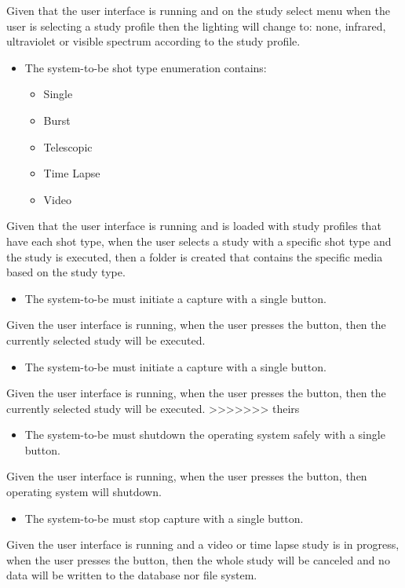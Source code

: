 Given that the user interface is running and on the study select menu when the user is selecting a study profile then the lighting will change to: none, infrared, ultraviolet or visible spectrum according to the study profile.
\begin{itemize}
	\item The system-to-be shot type enumeration contains:
	      \begin{itemize}
		      \item Single
		      \item Burst
		      \item Telescopic
		      \item Time Lapse
		      \item Video
	      \end{itemize}
\end{itemize}
Given that the user interface is running and is loaded with study profiles that have each shot type, when the user selects a study with a specific shot type and the study is executed, then a folder is created that contains the specific media based on the study type.
\begin{itemize}
	\item The system-to-be must initiate a capture with a single button.
\end{itemize}
Given the user interface is running, when the user presses the button, then the currently selected study will be executed.
\begin{itemize}
	\item The system-to-be must initiate a capture with a single button.
\end{itemize}
Given the user interface is running, when the user presses the button, then the currently selected study will be executed.
>>>>>>> theirs
\begin{itemize}
	\item The system-to-be must shutdown the operating system safely with a single button.
\end{itemize}
Given the user interface is running, when the user presses the button, then operating system will shutdown.
\begin{itemize}
	\item The system-to-be must stop capture with a single button.
\end{itemize}
Given the user interface is running and a video or time lapse study is in progress, when the user presses the button, then the whole study will be canceled and no data will be written to the database nor file system.
